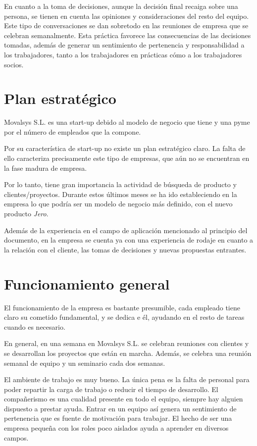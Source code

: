 	En cuanto a la toma de decisiones, aunque la decisión final recaiga sobre una persona, se tienen en cuenta las opiniones y consideraciones del resto del equipo. Este tipo de conversaciones se dan sobretodo en las reuniones de empresa que se celebran semanalmente. Esta práctica favorece las consecuencias de las decisiones tomadas, además de generar un sentimiento de pertenencia y responsabilidad a los trabajadores, tanto a los trabajadores en prácticas cómo a los trabajadores socios. 

	\section{Plan estratégico}
	
	Movalsys S.L. es una start-up debido al modelo de negocio que tiene y una pyme por el número de empleados que la compone. 
	
	Por su característica de start-up no existe un plan estratégico claro. La falta de ello caracteriza precisamente este tipo de empresas, que aún no se encuentran en la fase madura de empresa.
	
	Por lo tanto, tiene gran importancia la actividad de búsqueda de producto y clientes/proyectos. Durante estos últimos meses se ha ido estableciendo en la empresa lo que podría ser un modelo de negocio más definido, con el nuevo producto \textit{Jero}.

	Además de la experiencia en el campo de aplicación mencionado al principio del documento, en la empresa se cuenta ya con una experiencia de rodaje en cuanto a la relación con el cliente, las tomas de decisiones y nuevas propuestas entrantes.

		
	
	\section{Funcionamiento general}
	
	El funcionamiento de la empresa es bastante presumible, cada empleado tiene claro su cometido fundamental, y se dedica e él, ayudando en el resto de tareas cuando es necesario. 
	
	En general, en una semana en Movalsys S.L. se celebran reuniones con clientes y se desarrollan los proyectos que están en marcha. Además, se celebra una reunión semanal de equipo y un seminario cada dos semanas.
	
	El ambiente de trabajo es muy bueno. La única pena es la falta de personal para poder repartir la carga de trabajo o reducir el tiempo de desarrollo. El compañerismo es una cualidad presente en todo el equipo, siempre hay alguien dispuesto a prestar ayuda. Entrar en un equipo así genera un sentimiento de pertenencia que es fuente de motivación para trabajar. El hecho de ser una empresa pequeña con los roles poco aislados ayuda a aprender en diversos campos.
	
	
	